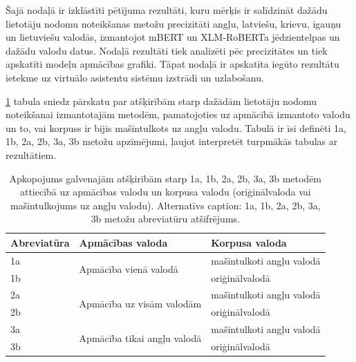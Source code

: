 
Šajā nodaļā ir izklāstīti pētījuma rezultāti, kuru mērķis ir salīdzināt dažādu lietotāju nodomu noteikšanas metožu precizitāti angļu, latviešu, krievu, igauņu un lietuviešu valodās, izmantojot mBERT un XLM-RoBERTa jēdzientelpas un dažādu valodu datus. Nodaļā rezultāti tiek analizēti pēc precizitātes un tiek apskatīti modeļu apmācības grafiki. Tāpat nodaļā ir apskatīta iegūto rezultātu ietekme uz virtuālo asistentu sistēmu izstrādi un uzlabošanu.

\ref{tab:legend} tabula sniedz pārskatu par atšķirībām starp dažādām lietotāju nodomu noteikšanai izmantotajām metodēm, pamatojoties uz apmācībā izmantoto valodu un to, vai korpuss ir bijis mašīntulkots uz angļu valodu. Tabulā ir īsi definēti 1a, 1b, 2a, 2b, 3a, 3b metožu apzīmējumi, ļaujot interpretēt turpmākās tabulas ar rezultātiem.


\begin{table}[htbp]
  \centering
  \caption{Apkopojums galvenajām atšķirībām starp 1a, 1b, 2a, 2b, 3a, 3b metodēm attiecībā uz apmācības valodu un korpusa valodu (oriģinālvaloda vai mašīntulkojums uz angļu valodu). Alternatīvs caption: 1a, 1b, 2a, 2b, 3a, 3b metožu abreviatūru atšifrējums.}
    \begin{tabular}{lll}\toprule
    Abreviatūra & Apmācības valoda & Korpusa valoda \\\midrule
    1a    & \multicolumn{1}{l}{\multirow{2}[0]{*}{Apmācība vienā valodā}} & mašīntulkoti angļu valodā \\
    1b    &       & oriģinālvalodā \\\midrule
    2a    & \multicolumn{1}{l}{\multirow{2}[0]{*}{Apmācība uz visām valodām}} & mašīntulkoti angļu valodā \\
    2b    &       & oriģinālvalodā \\\midrule
    3a    & \multicolumn{1}{l}{\multirow{2}[0]{*}{Apmācība tikai angļu valodā}} & mašīntulkoti angļu valodā \\
    3b    &       & oriģinālvalodā \\\bottomrule
    \end{tabular}%
  \label{tab:legend}%
\end{table}%


